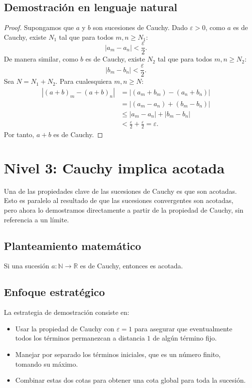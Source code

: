 \subsection{Demostración en lenguaje natural}

\begin{proof}
Supongamos que $a$ y $b$ son sucesiones de Cauchy. Dado $\varepsilon > 0$, como $a$ es de Cauchy, existe $N_1$ tal que para todos $m, n \geq N_1$:
\[|a_m - a_n| < \frac{\varepsilon}{2}.\]
De manera similar, como $b$ es de Cauchy, existe $N_2$ tal que para todos $m, n \geq N_2$:
\[|b_m - b_n| < \frac{\varepsilon}{2}.\]
Sea $N = N_1 + N_2$. Para cualesquiera $m, n \geq N$:
\begin{align*}
|(a+b)_m - (a+b)_n| &= |(a_m + b_m) - (a_n + b_n)|\\
&= |(a_m - a_n) + (b_m - b_n)|\\
&\leq |a_m - a_n| + |b_m - b_n|\\
&< \frac{\varepsilon}{2} + \frac{\varepsilon}{2} = \varepsilon.
\end{align*}
Por tanto, $a + b$ es de Cauchy.
\end{proof}

\section{Nivel 3: Cauchy implica acotada}

Una de las propiedades clave de las sucesiones de Cauchy es que son acotadas. Esto es paralelo al resultado de que las sucesiones convergentes son acotadas, pero ahora lo demostramos directamente a partir de la propiedad de Cauchy, sin referencia a un límite.

\subsection{Planteamiento matemático}

\begin{teorema}
Si una sucesión $a : \mathbb{N} \to \mathbb{R}$ es de Cauchy, entonces es acotada.
\end{teorema}

\subsection{Enfoque estratégico}

La estrategia de demostración consiste en:
\begin{itemize}
  \item Usar la propiedad de Cauchy con $\varepsilon = 1$ para asegurar que eventualmente todos los términos permanezcan a distancia $1$ de algún término fijo.
  \item Manejar por separado los términos iniciales, que es un número
    finito,  tomando su máximo.
  \item Combinar estas dos cotas para obtener una cota global para toda la sucesión.
\end{itemize}

